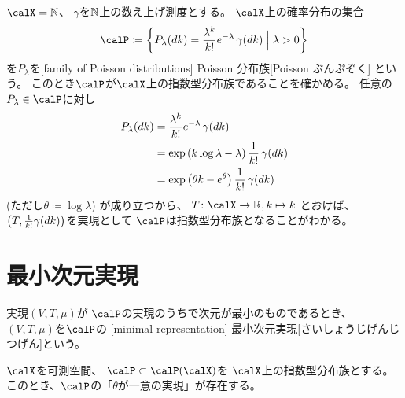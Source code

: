 \documentclass[report]{jlreq}
\begin{document}
\begin{example}
    $\calX = \N$、
    $\gamma$を$\mathbb{N}$上の数え上げ測度とする。
    $\calX$上の確率分布の集合
    \begin{equation}
        \calP \coloneqq \mybrace{
            P_\lambda(dk)
                = \frac{\lambda^k}{k!} e^{-\lambda} \, \gamma(dk)
            \;\Big|\;
            \lambda > 0
        }
    \end{equation}
    を$P_\lambda$を[family of Poisson distributions]
        {Poisson 分布族}[Poisson ぶんぷぞく]
    という。
    このとき$\calP$が$\calX$上の指数型分布族であることを確かめる。
    任意の$P_\lambda \in \calP$に対し
    \begin{alignat}{1}
        P_\lambda(dk)
            &= \frac{\lambda^k}{k!} e^{-\lambda} \, \gamma(dk) \\
            &= \exp\left({
                k \log\lambda - \lambda
            }\right) \frac{1}{k!} \, \gamma(dk) \\
            &= \exp\left({
                \theta k - e^\theta
            }\right) \frac{1}{k!} \, \gamma(dk)
    \end{alignat}
    (ただし$\theta \coloneqq \log \lambda$)
    が成り立つから、
    $T \colon \calX \to \R, k \mapsto k$
    とおけば、
    $\left({ T, \frac{1}{k!} \gamma(dk) }\right)$を実現として
    $\calP$は指数型分布族となることがわかる。
\end{example}

%
\section{最小次元実現}


\begin{definition}[最小次元実現]
    実現$(V, T, \mu)$が
    $\calP$の実現のうちで次元が最小のものであるとき、
    $(V, T, \mu)$を$\calP$の
    [minimal representation]
        {最小次元実現}[さいしょうじげんじつげん]という。
\end{definition}

\begin{theorem}
    $\calX$を可測空間、
    $\calP \subset \calP(\calX)$を
    $\calX$上の指数型分布族とする。
    このとき、$\calP$の「$\theta$が一意の実現」が存在する。
\end{theorem}
\end{document}
